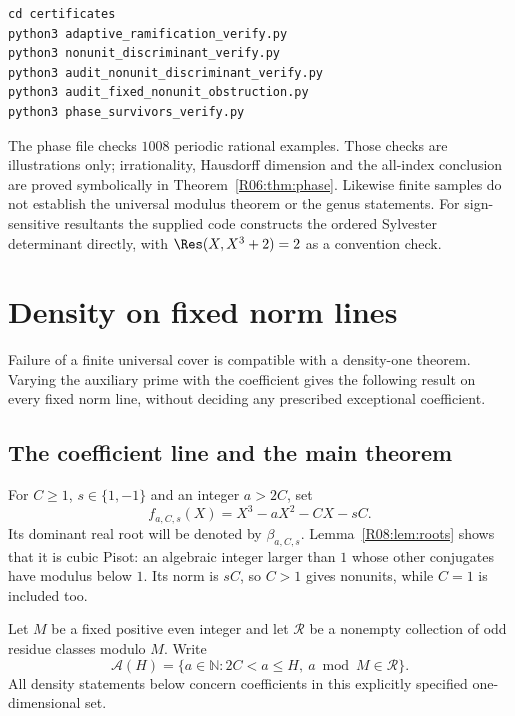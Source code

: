 \documentclass[11pt,a4paper]{article}
\theoremstyle{definition}\newtheorem{definition}[theorem]{Definition}
\theoremstyle{remark}\newtheorem{remark}[theorem]{Remark}
\newcommand{\N}{\mathbb N}\newcommand{\Z}{\mathbb Z}\newcommand{\Q}{\mathbb Q}
\begin{document}
\begin{lstlisting}
cd certificates
python3 adaptive_ramification_verify.py
python3 nonunit_discriminant_verify.py
python3 audit_nonunit_discriminant_verify.py
python3 audit_fixed_nonunit_obstruction.py
python3 phase_survivors_verify.py
\end{lstlisting}
The phase file checks $1008$ periodic rational examples. Those checks
are illustrations only; irrationality, Hausdorff dimension and the
all-index conclusion are proved symbolically in
Theorem~\ref{R06:thm:phase}. Likewise finite samples do not establish the
universal modulus theorem or the genus statements.
For sign-sensitive resultants the supplied code constructs the
ordered Sylvester determinant directly, with
$\Res(X,X^3+2)=2$ as a convention check.



\endgroup

\section{Density on fixed norm lines}\label{src:R08}
Failure of a finite universal cover is compatible with a density-one theorem. Varying the auxiliary prime with the coefficient gives the following result on every fixed norm line, without deciding any prescribed exceptional coefficient.
\medskip
\begingroup




\subsection{The coefficient line and the main theorem}

For $C\ge1$, $s\in\{1,-1\}$ and an integer $a>2C$, set
\begin{equation}\label{R08:eq:family}
               f_{a,C,s}(X)=X^3-aX^2-CX-sC.
\end{equation}
Its dominant real root will be denoted by $\beta_{a,C,s}$.
Lemma~\ref{R08:lem:roots} shows that it is cubic Pisot: an algebraic integer
larger than $1$ whose other conjugates have modulus below $1$.
Its norm is $sC$, so $C>1$ gives nonunits, while $C=1$ is included too.

Let $M$ be a fixed positive even integer and let $\mathcal R$ be a
nonempty collection of odd residue classes modulo $M$. Write
\[
 \mathcal A(H)=\{a\in\N:2C<a\le H,\ a\bmod M\in\mathcal R\}.
\]
All density statements below concern coefficients in this explicitly
specified one-dimensional set.
\end{document}

